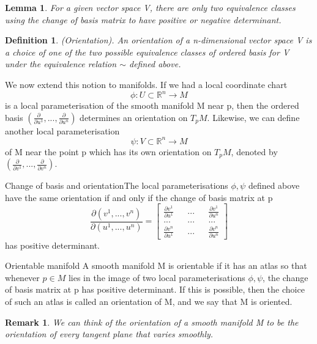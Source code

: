 \documentclass[twoside]{article}
\newtheorem{lemma}[theorem]{Lemma}
\newtheorem{definition}[theorem]{Definition}
\newtheorem{remark}[theorem]{Remark}
\begin{document}
\begin{lemma}For a given vector space V, there are only two equivalence classes using the change of basis matrix to have positive or negative determinant.
\end{lemma}

\begin{definition}(Orientation). An orientation of a n-dimensional vector space V is a choice of one of the two possible equivalence classes of ordered basis for V under the equivalence relation $\sim$ defined above.
\end{definition}

We now extend this notion to manifolds. If we had a local coordinate chart 
$$
\phi: U \subset \mathbb{R}^n \rightarrow M
$$
is a local parameterisation of the smooth manifold M near p, then the ordered basis $(\frac{\partial}{\partial u^1},...,\frac{\partial}{\partial u^n})$ determines an orientation on $T_pM.$ Likewise, we can define another local parameterisation 
$$
\psi: V \subset \mathbb{R}^n \rightarrow M
$$
of M near the point p which has its own orientation on $T_pM$, denoted by $(\frac{\partial}{\partial v^1},...,\frac{\partial}{\partial v^n}).$

\begin{theorem_exam}{Change of basis and orientation}{}The local parameterisations $\phi, \psi$ defined above have the same orientation if and only if the change of basis matrix at p 
$$
\frac{\partial (v^1,...,v^n)}{\partial (u^1,...,u^n)} = 
\begin{bmatrix}
\frac{\partial v^1}{\partial u^1} && ... && \frac{\partial v^1}{\partial u^n} \\
... && ... && ... \\
\frac{\partial v^n}{\partial u^1} && ... && \frac{\partial v^n}{\partial u^n} 
\end{bmatrix}
$$
has positive determinant.
\end{theorem_exam}

\begin{definition_exam}{Orientable manifold}{} A smooth manifold M is orientable if it has an atlas so that whenever $p \in M$ lies in the image of two local parameterisations $\phi, \psi$, the change of basis matrix at p has positive determinant.
If this is possible, then the choice of such an atlas is called an orientation of M, and we say that M is oriented.
\end{definition_exam}

\begin{remark}We can think of the orientation of a smooth manifold M to be the orientation of every tangent plane that varies smoothly.
\end{remark}
\end{document}
